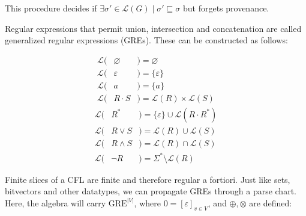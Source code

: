 \documentclass[portrait,a0b,final,a4resizeable]{a0poster}
\def\jointspacing{\vspace{0.3in}}
\begin{document}
\begin{poster}
\begin{multicols}{2}
      \null\hspace*{3cm}\begin{minipage}[c]{0.90\columnwidth}
      This procedure decides if $\exists \sigma' \in \mathcal{L}(G) \mid \sigma' \sqsubseteq \sigma$ but forgets provenance.
\vspace{1cm}
      \end{minipage}
      \jointspacing

\pagebreak
      \jointspacing

      \hspace*{2cm}\begin{minipage}[c]{0.90\columnwidth}
Regular expressions that permit union, intersection and concatenation are called generalized regular expressions (GREs). These can be constructed as follows:
\end{minipage}

\vspace{-2cm}
\setlength{\columnseprule}{0pt}
\setlength{\columnsep}{-3cm}
\begin{multicols}{2}
\begin{eqnarray*}
\mathcal{L}(& \varnothing & ) = \varnothing \\
\mathcal{L}(& \varepsilon & ) = \{\varepsilon\} \\
\mathcal{L}(& a           & ) = \{a\}\\
\mathcal{L}(& R\cdot S    & ) = \mathcal{L}(R) \times \mathcal{L}(S)
\end{eqnarray*} \break\vspace{-0.45cm}
\begin{eqnarray*}
\mathcal{L}(& R^*         & ) = \{\varepsilon\} \cup \mathcal{L}(R\cdot R^*)\\
\mathcal{L}(& R\vee S     & ) = \mathcal{L}(R) \cup \mathcal{L}(S)\\
\mathcal{L}(& R\land S    & ) = \mathcal{L}(R) \cap \mathcal{L}(S)\\
\mathcal{L}(& \neg R      & ) = \Sigma^* \setminus \mathcal{L}(R)
\end{eqnarray*}
\end{multicols}

\jointspacing

\hspace*{2cm}\begin{minipage}[c]{0.90\columnwidth}
Finite slices of a CFL are finite and therefore regular a fortiori. Just like sets, bitvectors and other datatypes, we can propagate GREs through a parse chart. Here, the algebra will carry $\text{GRE}^{|V|}$, where $0=[\varepsilon]_{v \in V}$, and $\oplus, \otimes$ are defined:
\end{minipage}


\end{multicols}
\end{poster}
\end{document}
